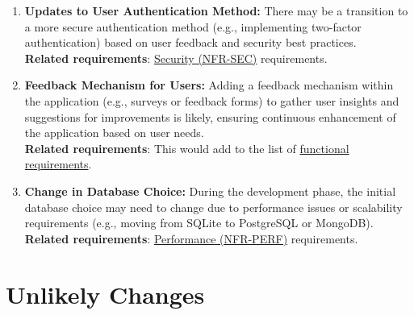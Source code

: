 \documentclass[12pt]{article}
\begin{document}
\begin{enumerate}[label=LC\arabic*]
	\item\textbf{Updates to User Authentication Method:} There may be a transition
	to a more secure authentication method (e.g., implementing two-factor
	authentication) based on user feedback and security best practices.\\
  \textbf{Related requirements}: \hyperref[NFR-SEC]{Security (NFR-SEC)}
  requirements.

	\item\textbf{Feedback Mechanism for Users:} Adding a feedback mechanism within
	the application (e.g., surveys or feedback forms) to gather user insights and
	suggestions for improvements is likely, ensuring continuous enhancement of the
	application based on user needs.\\
  \textbf{Related requirements}: This would add to the list of
  \hyperref[sec_funcReq]{functional requirements}.

  \item \textbf{Change in Database Choice:} During the development phase, the
	initial database choice may need to change due to performance issues or
	scalability requirements (e.g., moving from SQLite to PostgreSQL or MongoDB).\\
  \textbf{Related requirements}: \hyperref[NFR-PERF]{Performance (NFR-PERF)}
  requirements.
\end{enumerate}

\newpage

\section{Unlikely Changes}    
\end{document}
